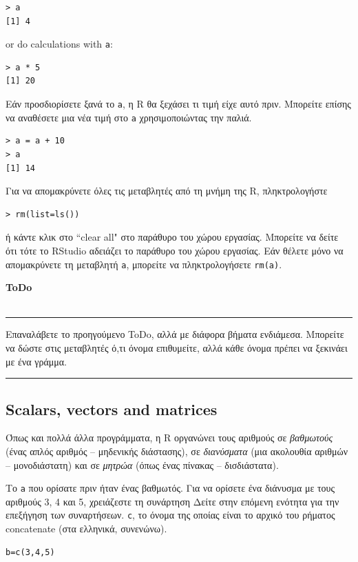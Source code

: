 \documentclass[a4paper,11pt,twocolumn,tablecaptionabove]{scrartcl}
\makeatletter
\newenvironment{ToDo} {%
  \begin{flushright}
    \hfill
    \begin{minipage}{0.95\columnwidth}         %
    \textsf{\textbf{ToDo}} \\
      \vspace{-0.85cm}\\
      {\color{Gray}\rule[-0.1cm]{\columnwidth}{1.5pt}}} { %
      {\color{Gray} \rule[0.3cm]{\columnwidth}{1.5pt}}
    \end{minipage}
    \vspace{1em}
  \end{flushright}
  }
\let\SF@@footnote\footnote
\def\footnote{\ifx\protect\@typeset@protect
 \expandafter\SF@@footnote
 \else
 \expandafter\SF@gobble@opt
 \fi
}
\edef\SF@gobble@opt{\noexpand\protect
 \expandafter\noexpand\csname SF@gobble@opt \endcsname}
\makeatother
\begin{document}
\begin{Verbatim}[frame=single,gobble=0]
> a 
[1] 4
\end{Verbatim}
or do calculations with \texttt{a}: 

\begin{Verbatim}[frame=single,gobble=0]
> a * 5
[1] 20
\end{Verbatim}

Εάν προσδιορίσετε ξανά το \texttt{a}, η R θα ξεχάσει τι τιμή είχε αυτό πριν. Μπορείτε επίσης να αναθέσετε μια
νέα τιμή στο \texttt{a} χρησιμοποιώντας την παλιά.

\begin{Verbatim}[frame=single,gobble=0]
> a = a + 10
> a
[1] 14
\end{Verbatim}

Για να απομακρύνετε όλες τις μεταβλητές από τη μνήμη της R, πληκτρολογήστε
\begin{Verbatim}[frame=single,gobble=0]
> rm(list=ls())
\end{Verbatim}
ή κάντε κλικ στο ``clear all" στο παράθυρο του χώρου εργασίας. Μπορείτε να δείτε ότι τότε το RStudio αδειάζει
το παράθυρο του χώρου εργασίας. Εάν θέλετε μόνο να απομακρύνετε τη μεταβλητή \texttt{a}, μπορείτε να πληκτρολογήσετε \texttt{rm(a)}.

\begin{ToDo}
Επαναλάβετε το προηγούμενο ToDo, αλλά με διάφορα βήματα ενδιάμεσα. Μπορείτε να δώστε στις μεταβλητές ό,τι όνομα
επιθυμείτε, αλλά κάθε όνομα πρέπει να ξεκινάει με ένα γράμμα. \\
\end{ToDo}

\subsection{Scalars, vectors and matrices}

Όπως και πολλά άλλα προγράμματα, η R οργανώνει τους αριθμούς σε \emph{βαθμωτούς} (ένας απλός αριθμός --
μηδενικής διάστασης), σε \emph{διανύσματα} (μια ακολουθία αριθμών -- μονοδιάστατη) και σε \emph{μητρώα}
(όπως ένας πίνακας -- δισδιάστατα).

Το \texttt{a} που ορίσατε πριν ήταν ένας βαθμωτός. Για να ορίσετε ένα διάνυσμα με τους αριθμούς 3, 4 και 5,
χρειάζεστε τη συνάρτηση\footnote{Δείτε στην επόμενη ενότητα για την επεξήγηση των συναρτήσεων.} \texttt{c},
το όνομα της οποίας είναι το αρχικό του ρήματος concatenate (στα ελληνικά, συνενώνω). 
\begin{Verbatim}[frame=single,gobble=0]
b=c(3,4,5)
\end{Verbatim}
\end{document}
